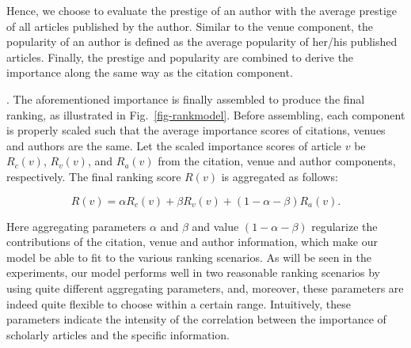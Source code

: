 Hence, we choose to evaluate the prestige of an author with the average prestige of all articles published by the author. Similar to the venue component, the popularity of an author is  defined as the average popularity of her/his published articles. Finally, the prestige and popularity are combined to derive the importance along the same way as the citation component.







. The aforementioned importance is finally assembled to produce the final ranking, as illustrated in Fig.~\ref{fig-rankmodel}. Before assembling, each component is properly scaled such that the average importance scores of citations, venues and authors are the same.  Let the scaled importance scores of article $v$ be $R_c(v)$, $R_v(v)$, and $R_a(v)$ from the citation, venue and author components, respectively.
%
The final ranking score $R(v)$ is aggregated as follows:

\vspace{-1ex}
\begin{small}
\begin{equation} \label{eq-ensemble}
R(v) =  \alpha R_c(v) + \beta R_v(v) + (1 - \alpha - \beta) R_a(v).
\end{equation}
\end{small}
\noindent Here aggregating parameters $\alpha$ and $\beta$ and value $(1 - \alpha - \beta)$ regularize the contributions of the citation, venue and author information,
which make our model be able to fit to the various ranking scenarios. As will be seen in the experiments, our model performs well in two reasonable ranking scenarios by using quite different aggregating parameters, and, moreover, these parameters are indeed quite flexible to choose within a certain range.
Intuitively, these parameters indicate the intensity of the correlation between the importance of scholarly articles and the specific information.


